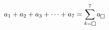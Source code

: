 $a_1+a_2+a_3+\cdots+a_7=\displaystyle\sum_{k=\text{\setlength{\fboxsep}{0.8pt}\framebox[5.6pt]{\rule{0pt}{3.2pt}}}}^{7} a_{\text{\setlength{\fboxsep}{0.8pt}\framebox[5.6pt]{\rule{0pt}{3.2pt}}}}$
